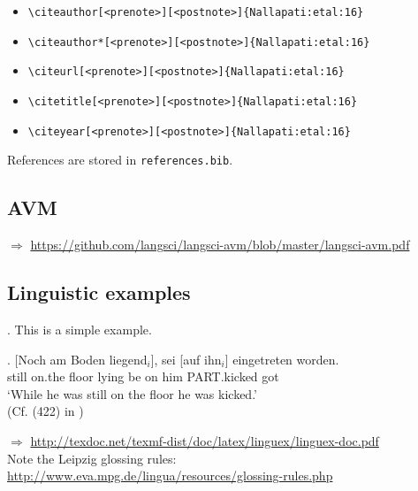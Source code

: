 \begin{itemize}
\item \verb=\citeauthor[<prenote>][<postnote>]{Nallapati:etal:16}= \newline \citeauthor[<prenote>][<postnote>]{Nallapati:etal:16}
\item \verb=\citeauthor*[<prenote>][<postnote>]{Nallapati:etal:16}= \newline \citeauthor*[<prenote>][<postnote>]{Nallapati:etal:16}
\item \verb=\citeurl[<prenote>][<postnote>]{Nallapati:etal:16}= \newline {}
\item \verb=\citetitle[<prenote>][<postnote>]{Nallapati:etal:16}= \newline {}
\item \verb=\citeyear[<prenote>][<postnote>]{Nallapati:etal:16}= \newline \citeyear[<prenote>][<postnote>]{Nallapati:etal:16}
\end{itemize} 

References are stored in \texttt{references.bib}.

\subsection{AVM}


\medskip

\noindent $\Rightarrow$ \url{https://github.com/langsci/langsci-avm/blob/master/langsci-avm.pdf}

\subsection{Linguistic examples}

\ex. This is a simple example.

\exg. [Noch am Boden liegend$_i$], sei [auf ihn$_i$] eingetreten worden.\\
still on.the floor lying be on him PART.kicked got\\
`While he was still on the floor he was kicked.'\\
(Cf. (422) in \cite{Mueller:02})

\noindent $\Rightarrow$ \url{http://texdoc.net/texmf-dist/doc/latex/linguex/linguex-doc.pdf} \\
Note the Leipzig glossing rules: \url{http://www.eva.mpg.de/lingua/resources/glossing-rules.php}

